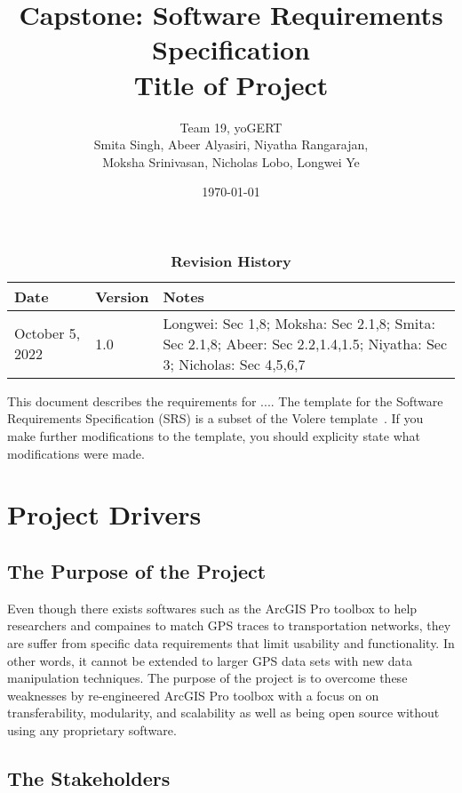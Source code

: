 \documentclass[12pt, titlepage]{article}
\title{Capstone: Software Requirements Specification\\Title of Project}
\author{Team 19, yoGERT
		\\ Smita Singh, Abeer Alyasiri, Niyatha Rangarajan,\\ Moksha Srinivasan, Nicholas Lobo, Longwei Ye
}
\date{\today}
\begin{document}
\maketitle

\tableofcontents
\listoftables
\listoffigures

\begin{table}[H]
\caption{\bf Revision History}
\begin{tabularx}{\textwidth}{p{3cm}p{2cm}X}
\toprule {\bf Date} & {\bf Version} & {\bf Notes}\\
\midrule
October 5, 2022 & 1.0 & Longwei: Sec 1,8; Moksha: Sec 2.1,8; Smita: Sec 2.1,8; Abeer: Sec 2.2,1.4,1.5; Niyatha: Sec 3; Nicholas: Sec 4,5,6,7 \\
\bottomrule
\end{tabularx}
\end{table}

\newpage


This document describes the requirements for ....  The template for the Software
Requirements Specification (SRS) is a subset of the Volere
template~\citep{RobertsonAndRobertson2012}.  If you make further modifications
to the template, you should explicity state what modifications were made.

\section{Project Drivers}

\subsection{The Purpose of the Project}
Even though there exists softwares such as the ArcGIS Pro toolbox to help researchers and compaines to match GPS traces to transportation networks, they are suffer from specific data requirements that limit usability and functionality. In other words, it cannot be extended to larger GPS data sets with new data manipulation techniques. The purpose of the project is to overcome these weaknesses by re-engineered ArcGIS Pro toolbox with a focus on on transferability, modularity, and scalability as well as being open source without using any proprietary software.

\subsection{The Stakeholders}
\end{document}
